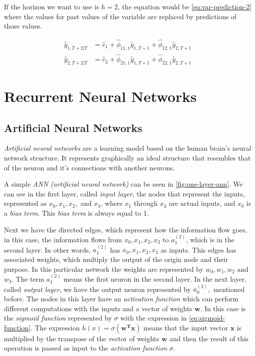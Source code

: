 If the horizon we want to use is $h = 2$, the equation would be
\autoref{eq:var-prediction-2} where the values for past values of the
variable are replaced by predictions of those values.

\begin{equation}
  \begin{aligned}
    \label{eq:var-prediction-2}
    \hat{y}_{1,T+2|T} & = \hat{c}_1 + \hat{\phi}_{11,1} \hat{y}_{1,T+1} +
    \hat{\phi}_{12,1} \hat{y}_{2,T+1} \\ 
    \hat{y}_{2,T+2|T} & = \hat{c}_2 + \hat{\phi}_{21,1} \hat{y}_{1,T+1} +
    \hat{\phi}_{22,1} \hat{y}_{2,T+1}
  \end{aligned}
\end{equation}
\chapter{Recurrent Neural Networks}
\label{ch:recurrent-neural-networks}

\section{Artificial Neural Networks}

\textit{Artificial neural networks} are a learning model based on the
human brain's neural network structure. It represents graphically an
ideal structure that resembles that of the neuron and it's connections
with another neurons.

A simple \textit{ANN (artificial neural network)} can be seen in
\autoref{fig:one-layer-ann}. We can see in the first layer, called
\textit{input layer}, the nodes that represent the inputs, represented
as $x_0, x_1, x_2,$ and $x_3$, where $x_1$ through $x_3$ are actual
inputs, and $x_0$ is a \textit{bias term}. This \textit{bias term} is
always equal to 1.

Next we have the directed edges, which represent how the information
flow goes, in this case, the information flows from $x_0, x_1, x_2,
x_3$ to $a_1^{(2)}$, which is in the second layer. In other words,
$a_1^{(2)}$ has $x_0, x_1, x_2, x_3$ as inputs. This edges has
associated weights, which multiply the output of the origin node and
their purpose. In this particular network the weights are represented
by $w_0, w_1, w_2$ and $w_3$. The term $a_1^{(2)}$ means the first
neuron in the second layer. In the next layer, called \textit{output
layer}, we have the output neuron represented by $a_0^{(2)},$
mentioned before. The nodes in this layer have an \textit{activation
function} which can perform different computations with the inputs and
a vector of weights $\mathbf{w}$. In this case is the \textit{sigmoid
function} represented by $\sigma$ with the expression in
\autoref{eq:sigmoid-function}. The expression $h(x) =
\sigma(\mathbf{w^Tx})$ means that the input vector $\mathbf{x}$ is
multiplied by the transpose of the vector of weights $\mathbf{w}$ and
then the result of this operation is passed as input to the
\textit{activation function} $\sigma$.

